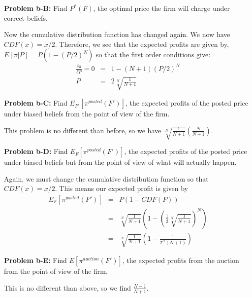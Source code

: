 \documentclass[psamsfonts]{amsart}
\newenvironment{sol}{\vspace{0.25cm}{\large \bfseries Solution:}}{\qedsymbol}
\newenvironment{prob}[1]{\begin{framed}{\large \bfseries Problem #1:}}{\end{framed}}
\begin{document}
\begin{prob}{b-B}
Find $P^*(F)$, the optimal price the firm will charge under correct beliefs.
\end{prob}
\begin{sol}
Now the cumulative distribution function has changed again. We now have $CDF(x)=x/2$. Therefore, we see that the expected profits are given by, $E[\pi | P] = P ( 1 - (P/2)^N)$ so that the first order conditions give:
\begin{eqnarray}
\frac{\delta \pi}{\delta P} = 0 &=& 1 - (N+1) (P/2)^N \\
P &=& 2 \sqrt[N]{\frac{1}{N+1}}
\end{eqnarray}
\end{sol}

\begin{prob}{b-C}
Find $E_{F'}[\pi^{posted}(F')]$, the expected profits of the posted price under biased beliefs from the point of view of the firm.
\end{prob}

\begin{sol}
This problem is no different than before, so we have $\sqrt[N]{\frac{1}{N+1}} \left( \frac{N}{N+1} \right)$. 
\end{sol}

\begin{prob}{b-D}
Find $E_{F}[\pi^{posted}(F')]$, the expected profits of the posted price under biased beliefs but from the point of view of what will actually happen.
\end{prob}
\begin{sol}
Again, we must change the cumulative distribution function so that $CDF(x) = x/2$. This means our expected profit is given by
\begin{eqnarray}
E_{F}[\pi^{posted}(F')] &=& P ( 1 - CDF(P)) \\
&=& \sqrt[N]{\frac{1}{N+1}} \left( 1 - \left( \frac{1}{2} \sqrt[N]{\frac{1}{N+1}} \right)^N \right) \\
&=& \sqrt[N]{\frac{1}{N+1}} \left( 1 - \frac{1}{2^{N} (N+1)} \right)
\end{eqnarray}
\end{sol}

\begin{prob}{b-E}
Find $E[\pi^{auction} (F')]$, the expected profits from the auction from the point of view of the firm. 
\end{prob}
\begin{sol}
This is no different than above, so we find $\frac{N-1}{N+1}$. 
\end{sol}
\end{document}
